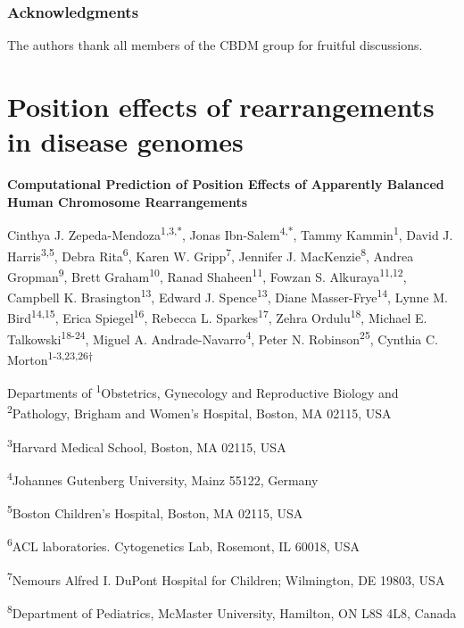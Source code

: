 \documentclass[a4paper,twoside=true,openright,parskip=full,chapterprefix=true,11pt,headings=normal,bibliography=totoc,listof=totoc,titlepage=on,captions=tableabove,draft=false]{scrreprt}
\theoremstyle{definition}
\theoremstyle{definition}
\theoremstyle{definition}
\theoremstyle{remark}
\begin{document}
\subsection{Acknowledgments}\label{acknowledgments}

The authors thank all members of the CBDM group for fruitful
discussions.

\chapter{Position effects of rearrangements in disease
genomes}\label{position-effect}

\textbf{Computational Prediction of Position Effects of Apparently
Balanced Human Chromosome Rearrangements}

Cinthya J. Zepeda-Mendoza\textsuperscript{1,3,*}, Jonas
Ibn-Salem\textsuperscript{4,*}, Tammy Kammin\textsuperscript{1}, David
J. Harris\textsuperscript{3,5}, Debra Rita\textsuperscript{6}, Karen W.
Gripp\textsuperscript{7}, Jennifer J. MacKenzie\textsuperscript{8},
Andrea Gropman\textsuperscript{9}, Brett Graham\textsuperscript{10},
Ranad Shaheen\textsuperscript{11}, Fowzan S.
Alkuraya\textsuperscript{11,12}, Campbell K.
Brasington\textsuperscript{13}, Edward J. Spence\textsuperscript{13},
Diane Masser-Frye\textsuperscript{14}, Lynne M.
Bird\textsuperscript{14,15}, Erica Spiegel\textsuperscript{16}, Rebecca
L. Sparkes\textsuperscript{17}, Zehra Ordulu\textsuperscript{18},
Michael E. Talkowski\textsuperscript{18-24}, Miguel A.
Andrade-Navarro\textsuperscript{4}, Peter N.
Robinson\textsuperscript{25}, Cynthia C.
Morton\textsuperscript{1-3,23,26†}

Departments of \textsuperscript{1}Obstetrics, Gynecology and
Reproductive Biology and \textsuperscript{2}Pathology, Brigham and
Women's Hospital, Boston, MA 02115, USA

\textsuperscript{3}Harvard Medical School, Boston, MA 02115, USA

\textsuperscript{4}Johannes Gutenberg University, Mainz 55122, Germany

\textsuperscript{5}Boston Children's Hospital, Boston, MA 02115, USA

\textsuperscript{6}ACL laboratories. Cytogenetics Lab, Rosemont, IL
60018, USA

\textsuperscript{7}Nemours Alfred I. DuPont Hospital for Children;
Wilmington, DE 19803, USA

\textsuperscript{8}Department of Pediatrics, McMaster University,
Hamilton, ON L8S 4L8, Canada
\end{document}
